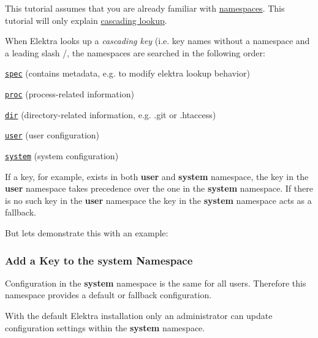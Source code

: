 This tutorial assumes that you are already familiar with \hyperlink{doc_tutorials_namespaces_md}{namespaces}. This tutorial will only explain \hyperlink{md_doc_help_elektra-cascading_doc_help_elektra-cascading_md}{cascading lookup}.

When Elektra looks up a {\itshape cascading key} (i.\+e. key names without a namespace and a leading slash {\ttfamily /}, the namespaces are searched in the following order\+:


\begin{DoxyItemize}
\item \href{https://github.com/ElektraInitiative/libelektra/blob/master/doc/help/elektra-namespaces.md#spec}{\tt spec} (contains metadata, e.\+g. to modify elektra lookup behavior)
\item \href{https://github.com/ElektraInitiative/libelektra/blob/master/doc/help/elektra-namespaces.md#proc}{\tt proc} (process-\/related information)
\item \href{https://github.com/ElektraInitiative/libelektra/blob/master/doc/help/elektra-namespaces.md#dir}{\tt dir} (directory-\/related information, e.\+g. {\ttfamily .git} or {\ttfamily .htaccess})
\item \href{https://github.com/ElektraInitiative/libelektra/blob/master/doc/help/elektra-namespaces.md#user}{\tt user} (user configuration)
\item \href{https://github.com/ElektraInitiative/libelektra/blob/master/doc/help/elektra-namespaces.md#system}{\tt system} (system configuration)
\end{DoxyItemize}

If a key, for example, exists in both {\bfseries user} and {\bfseries system} namespace, the key in the {\bfseries user} namespace takes precedence over the one in the {\bfseries system} namespace. If there is no such key in the {\bfseries user} namespace the key in the {\bfseries system} namespace acts as a fallback.

But lets demonstrate this with an example\+:

\subsubsection*{Add a Key to the system Namespace}

Configuration in the {\bfseries system} namespace is the same for all users. Therefore this namespace provides a default or fallback configuration.

With the default Elektra installation only an administrator can update configuration settings within the {\bfseries system} namespace.


